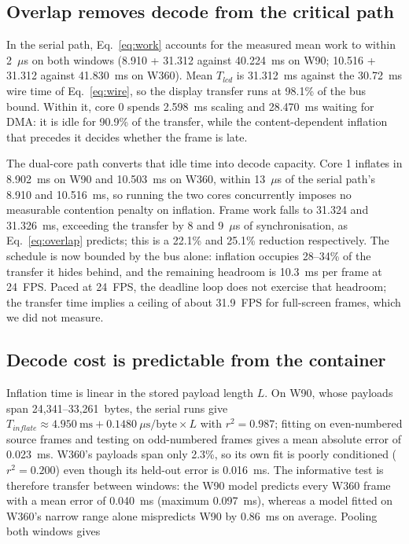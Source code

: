 \documentclass[11pt,twocolumn]{article}
\begin{document}
\subsection{Overlap removes decode from the critical path}
\label{sec:bus}

In the serial path, Eq.~\eqref{eq:work} accounts for the measured mean work
to within 2~$\mu$s on both windows (8.910 + 31.312 against 40.224~ms on W90;
10.516 + 31.312 against 41.830~ms on W360).  Mean $T_{lcd}$ is 31.312~ms
against the 30.72~ms wire time of Eq.~\eqref{eq:wire}, so the display transfer
runs at 98.1\% of the bus bound.  Within it, core 0 spends 2.598~ms scaling
and 28.470~ms waiting for DMA: it is idle for 90.9\% of the transfer, while
the content-dependent inflation that precedes it decides whether the frame is
late.

The dual-core path converts that idle time into decode capacity.  Core 1
inflates in 8.902~ms on W90 and 10.503~ms on W360, within 13~$\mu$s of the
serial path's 8.910 and 10.516~ms, so running the two cores concurrently
imposes no measurable contention penalty on inflation.  Frame work
falls to 31.324 and 31.326~ms, exceeding the transfer by 8 and 9~$\mu$s of
synchronisation, as Eq.~\eqref{eq:overlap} predicts; this is a 22.1\% and
25.1\% reduction respectively.  The schedule is now bounded by the bus alone:
inflation occupies 28--34\% of the transfer it hides behind, and the
remaining headroom is 10.3~ms per frame at 24~FPS.  Paced at 24~FPS, the
deadline loop does not exercise that headroom; the transfer time implies a
ceiling of about 31.9~FPS for full-screen frames, which we did not measure.

\subsection{Decode cost is predictable from the container}
\label{sec:model}

Inflation time is linear in the stored payload length $L$.  On W90, whose
payloads span 24,341--33,261~bytes, the serial runs give
$T_{inflate}\approx4.950~\text{ms}+0.1480~\mu\text{s/byte}\times L$ with
$r^2=0.987$; fitting on even-numbered source frames and testing on
odd-numbered frames gives a mean absolute error of 0.023~ms.  W360's payloads
span only 2.3\%, so its own fit is poorly conditioned ($r^2=0.200$) even
though its held-out error is 0.016~ms.  The informative test is therefore
transfer between windows: the W90 model predicts every W360 frame with a mean
error of 0.040~ms (maximum 0.097~ms), whereas a model fitted on W360's narrow
range alone mispredicts W90 by 0.86~ms on average.  Pooling both windows gives
\end{document}
